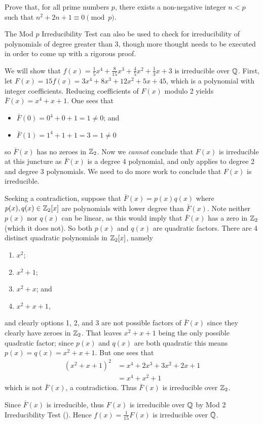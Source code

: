 \begin{exercise}
    Prove that, for all prime numbers $p$, there exists a non-negative integer $n < p$ such that $n^2 + 2n + 1 \equiv 0 \pmod{p}$.
\end{exercise}

The Mod $p$ Irreducibility Test can also be used to check for irreducibility of polynomials of degree greater than 3, though more thought needs to be executed in order to come up with a rigorous proof.

\begin{example}\label{example-x^4+x+1-is-irreducible-over-Z2}
    We will show that $f(x) = \frac15x^4 + \frac8{15}x^3 + \frac45x^2 + \frac13x + 3$ is irreducible over $\mathbb{Q}$. First, let $F(x) = 15f(x) = 3x^4 + 8x^3 + 12x^2 + 5x + 45$, which is a polynomial with integer coefficients. Reducing coefficients of $F(x)$ modulo 2 yields $\bar{F}(x) = x^4 + x + 1$. One sees that
    \begin{itemize}
        \item $\bar{F}(0) = 0^4 + 0 + 1 = 1 \neq 0$; and
        \item $\bar{F}(1) = 1^4 + 1 + 1 = 3 = 1 \neq 0$
    \end{itemize}
    so $\bar{F}(x)$ has no zeroes in $\mathbb{Z}_2$. Now we \textit{cannot} conclude that $F(x)$ is irreducible at this juncture as $\bar{F}(x)$ is a degree 4 polynomial, and  only applies to degree 2 and degree 3 polynomials. We need to do more work to conclude that $F(x)$ is irreducible.

    Seeking a contradiction, suppose that $\bar{F}(x) = p(x)q(x)$ where $p(x), q(x) \in \mathbb{Z}_2[x]$ are polynomials with lower degree than $\bar{F}(x)$. Note neither $p(x)$ nor $q(x)$ can be linear, as this would imply that $\bar{F}(x)$ has a zero in $\mathbb{Z}_2$ (which it does not). So both $p(x)$ and $q(x)$ are quadratic factors. There are 4 distinct quadratic polynomials in $\mathbb{Z}_2[x]$, namely
    \begin{enumerate}
        \item $x^2$;
        \item $x^2 + 1$;
        \item $x^2 + x$; and
        \item $x^2 + x + 1$,
    \end{enumerate}
    and clearly options 1, 2, and 3 are not possible factors of $\bar{F}(x)$ since they clearly have zeroes in $\mathbb{Z}_2$. That leaves $x^2 + x + 1$ being the only possible quadratic factor; since $p(x)$ and $q(x)$ are both quadratic this means $p(x) = q(x) = x^2 + x + 1$. But one sees that
    \begin{align*}
        (x^2 + x + 1)^2 &= x^4 + 2x^3 + 3x^2 + 2x + 1\\
        &= x^4 + x^2 + 1
    \end{align*}
    which is not $\bar{F}(x)$, a contradiction. Thus $\bar{F}(x)$ is irreducible over $\mathbb{Z}_2$.

    Since $\bar{F}(x)$ is irreducible, thus $F(x)$ is irreducible over $\mathbb{Q}$ by Mod 2 Irreducibility Test (). Hence $f(x) = \frac1{15} F(x)$ is irreducible over $\mathbb{Q}$.
\end{example}

